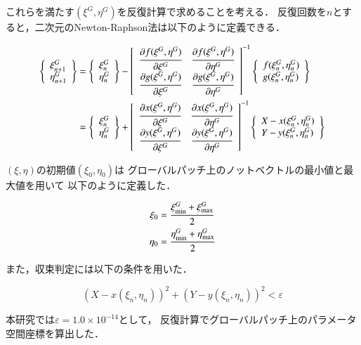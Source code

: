 \noindent
これらを満たす$(\xi^G,\eta^G)$を反復計算で求めることを考える．
反復回数を$n$とすると，二次元のNewton-Raphson法は以下のように定義できる．

\begin{align}
  \left\{
    \begin{array}{l}
      \xi^G_{n+1}\\
      \eta^G_{n+1}
    \end{array}
  \right\}&=
  \left\{
    \begin{array}{l}
      \xi^G_{n}\\
      \eta^G_{n}
    \end{array}
  \right\}-
  {\left[
    \begin{array}{cc}
      \cfrac{\partial{f(\xi^G,\eta^G)}}{\partial{\xi^G}} & \cfrac{\partial{f(\xi^G,\eta^G)}}{\partial{\eta^G}} \\
      \cfrac{\partial{g(\xi^G,\eta^G)}}{\partial{\xi^G}} & \cfrac{\partial{g(\xi^G,\eta^G)}}{\partial{\eta^G}}
    \end{array}
  \right]}^{-1}
  \left\{
    \begin{array}{l}
      f(\xi^G_n,\eta^G_n)\\
      g(\xi^G_n,\eta^G_n)
    \end{array}
  \right\} \nonumber \\
  &=
  \left\{
    \begin{array}{l}
      \xi^G_{n}\\
      \eta^G_{n}
    \end{array}
  \right\}+
  {\left[
    \begin{array}{cc}
      \cfrac{\partial{x(\xi^G,\eta^G)}}{\partial{\xi^G}} & \cfrac{\partial{x(\xi^G,\eta^G)}}{\partial{\eta^G}} \\
      \cfrac{\partial{y(\xi^G,\eta^G)}}{\partial{\xi^G}} & \cfrac{\partial{y(\xi^G,\eta^G)}}{\partial{\eta^G}}
    \end{array}
  \right]}^{-1}
  \left\{
    \begin{array}{l}
      X-x(\xi^G_n,\eta^G_n)\\
      Y-y(\xi^G_n,\eta^G_n)
    \end{array}
  \right\}
\end{align}

\noindent
$(\xi,\eta)$の初期値$(\xi_0,\eta_0)$は
グローバルパッチ上のノットベクトルの最小値と最大値を用いて
以下のように定義した．

\begin{align}
  \xi_0&=\frac{\xi^G_{\rm{min}}+\xi^G_{\rm{max}}}{2}\\
  \eta_0&=\frac{\eta^G_{\rm{min}}+\eta^G_{\rm{max}}}{2}
\end{align}

\noindent
また，収束判定には以下の条件を用いた．

\begin{equation}
  {\left(X-x(\xi_n,\eta_n)\right)}^2+{\left(Y-y(\xi_n,\eta_n)\right)}^2<\varepsilon
\end{equation}

\noindent
本研究では$\varepsilon=1.0\times10^{-14}$として，
反復計算でグローバルパッチ上のパラメータ空間座標を算出した．